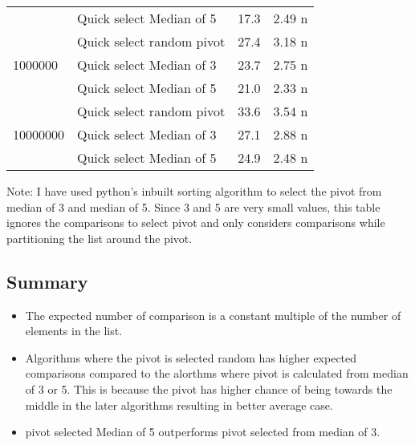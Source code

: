 \documentclass{homeworg}
\begin{document}
\begin{table}[htbp]
\begin{tabular}{llrr}
       & Quick select Median of 5 &                 17.3 &               2.49 n \\
\cline{1-4}
\multirow{3}{*}{1000000} & Quick select random pivot &                 27.4 &               3.18 n \\
        & Quick select Median of 3 &                 23.7 &               2.75 n \\
        & Quick select Median of 5 &                 21.0 &               2.33 n \\
\cline{1-4}
\multirow{3}{*}{10000000} & Quick select random pivot &                 33.6 &               3.54 n \\
         & Quick select Median of 3 &                 27.1 &               2.88 n \\
         & Quick select Median of 5 &                 24.9 &               2.48 n \\

\bottomrule
\end{tabular}
\end{table}
Note: I have used python's inbuilt sorting algorithm to select the pivot from median of 3 and median of 5. Since 3 and 5 are very small values, this table ignores the comparisons to select pivot and only considers comparisons while partitioning the list around the pivot. 

\subsection{Summary}
\begin{itemize}
    \item The expected number of comparison is a constant multiple of the number of elements in the list.
    \item Algorithms where the pivot is selected random has higher expected comparisons compared to the alorthms where pivot is calculated from median of 3 or 5. This is because the pivot has higher chance of being towards the middle in the later algorithms resulting in better average case.
    \item pivot selected Median of 5 outperforms pivot selected from median of 3. 
\end{itemize}
\end{document}

